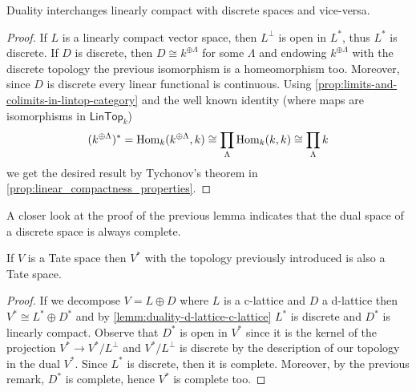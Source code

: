 \begin{lemma}\label{lemm:duality-d-lattice-c-lattice}
	Duality interchanges linearly compact with discrete spaces and vice-versa. 
\end{lemma}
\begin{proof}
	If $L$ is a linearly compact vector space, then $L^{\perp}$ is open in $L^{*}$, thus $L^{*}$ is discrete. If $D$ is discrete, then $D \cong k^{\oplus \Lambda}$ for some $\Lambda$ and endowing $k^{\oplus \Lambda}$ with the discrete topology the previous isomorphism is a homeomorphism too. Moreover, since $D$ is discrete every linear functional is continuous. Using \cref{prop:limits-and-colimits-in-lintop-category} and the well known identity (where maps are isomorphisms in $\mathsf{LinTop}_{k}$)
	\[
		(k^{\oplus \Lambda})^{*} = \operatorname{Hom}_{k}(k^{\oplus \Lambda}, k) \cong \prod_{\Lambda} \operatorname{Hom}_{k}(k, k) \cong \prod_{\Lambda} k
	\]
	we get the desired result by Tychonov's theorem in \cref{prop:linear_compactness_properties}. 
\end{proof}
\begin{remark}\label{rem:dual-of-discrete-is-complete}
	A closer look at the proof of the previous lemma indicates that the dual space of a discrete space is always complete.
\end{remark}
\begin{proposition}\label{prop:dual-space-is-tate}
	If $V$ is a Tate space then $V^{*}$ with the topology previously introduced is also a Tate space.
\end{proposition}
\begin{proof}
	If we decompose $V = L \oplus D$ where $L$ is a c-lattice and $D$ a d-lattice then $V^{*} \cong L^{*} \oplus D^{*}$ and by \cref{lemm:duality-d-lattice-c-lattice} $L^{*}$ is discrete and $D^{*}$ is linearly compact. Observe that $D^{*}$ is open in $V^{*}$ since it is the kernel of the projection $V^{*} \to V^{*}/L^{\perp}$ and $V^{*}/L^{\perp}$ is discrete by the description of our topology in the dual $V^{*}$. Since $L^{*}$ is discrete, then it is complete. Moreover, by the previous remark, $D^{*}$ is complete, hence $V^{*}$ is complete too.
\end{proof}

